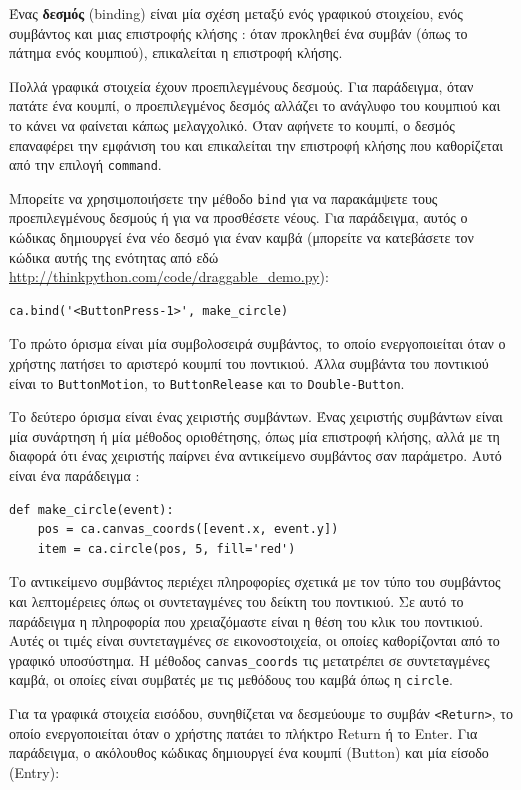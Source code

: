 \documentclass[10pt]{book}
\begin{document}
Ένας {\bf δεσμός} (binding) είναι μία σχέση μεταξύ ενός γραφικού στοιχείου, ενός 
συμβάντος και μιας επιστροφής κλήσης :  όταν προκληθεί ένα συμβάν (όπως το πάτημα ενός 
κουμπιού), επικαλείται η επιστροφή κλήσης.  

Πολλά γραφικά στοιχεία έχουν προεπιλεγμένους δεσμούς.  Για παράδειγμα, όταν πατάτε ένα 
κουμπί, ο προεπιλεγμένος δεσμός αλλάζει το ανάγλυφο του κουμπιού και το κάνει να φαίνεται 
κάπως μελαγχολικό.  Όταν αφήνετε το κουμπί, ο δεσμός επαναφέρει την εμφάνιση του και επικαλείται 
την επιστροφή κλήσης που καθορίζεται από την επιλογή  {\tt command}.

 Μπορείτε να χρησιμοποιήσετε την μέθοδο  {\tt bind}  για να παρακάμψετε τους προεπιλεγμένους δεσμούς ή για να προσθέσετε νέους.  Για παράδειγμα, αυτός ο κώδικας δημιουργεί 
ένα νέο δεσμό για έναν καμβά (μπορείτε να κατεβάσετε τον κώδικα αυτής της ενότητας από εδώ   \url{http://thinkpython.com/code/draggable_demo.py}):

\begin{verbatim}
ca.bind('<ButtonPress-1>', make_circle)
\end{verbatim}
%
 Το πρώτο όρισμα είναι μία συμβολοσειρά συμβάντος, το οποίο ενεργοποιείται όταν ο χρήστης 
πατήσει το αριστερό κουμπί του ποντικιού.  Άλλα συμβάντα του ποντικιού είναι το  {\tt ButtonMotion},  το  {\tt ButtonRelease}  και το  {\tt Double-Button}.

 Το δεύτερο όρισμα είναι ένας χειριστής συμβάντων.  Ένας χειριστής συμβάντων είναι μία 
συνάρτηση ή μία μέθοδος οριοθέτησης, όπως μία επιστροφή κλήσης, αλλά με τη διαφορά 
ότι ένας χειριστής παίρνει ένα αντικείμενο συμβάντος σαν παράμετρο.  Αυτό είναι ένα 
παράδειγμα :

\begin{verbatim}
def make_circle(event):
    pos = ca.canvas_coords([event.x, event.y])
    item = ca.circle(pos, 5, fill='red')
\end{verbatim}
%
 Το αντικείμενο συμβάντος περιέχει πληροφορίες σχετικά με τον τύπο του συμβάντος και λεπτομέρειες όπως οι συντεταγμένες του δείκτη του ποντικιού.  Σε αυτό το παράδειγμα η πληροφορία που χρειαζόμαστε είναι η θέση του κλικ του ποντικιού.  Αυτές οι τιμές είναι 
συντεταγμένες σε εικονοστοιχεία, οι οποίες καθορίζονται από το γραφικό υποσύστημα.  Η μέθοδος 
 \verb"canvas_coords"  τις μετατρέπει σε συντεταγμένες καμβά, οι οποίες είναι συμβατές 
με τις μεθόδους του καμβά όπως η  {\tt circle}.

Για τα γραφικά στοιχεία εισόδου, συνηθίζεται να δεσμεύουμε το συμβάν  \verb"<Return>", 
το οποίο ενεργοποιείται όταν ο χρήστης πατάει το πλήκτρο  {\sf Return}  ή το 
{\sf Enter}.  Για παράδειγμα, ο ακόλουθος κώδικας δημιουργεί ένα κουμπί  (Button)  και μία είσοδο (Entry):
\end{document}

